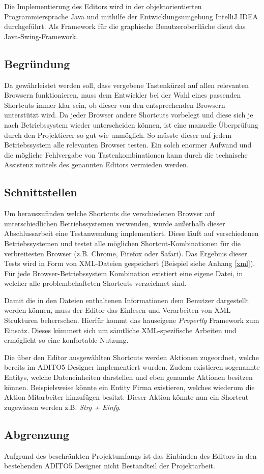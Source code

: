 Die Implementierung des Editors wird in der objektorientierten Programmiersprache Java und mithilfe der Entwicklungsumgebung IntelliJ IDEA durchgeführt. Als Framework für die graphische Benutzeroberfläche dient das Java-Swing-Framework.

\subsection{Begründung}

Da gewährleistet werden soll, dass vergebene Tastenkürzel auf allen relevanten Browsern funktionieren, muss dem Entwickler bei der Wahl eines passenden Shortcuts immer klar sein, ob dieser von den entsprechenden Browsern unterstützt wird. Da jeder Browser andere Shortcuts vorbelegt und diese sich je nach Betriebssystem wieder unterscheiden können, ist eine manuelle Überprüfung durch den Projektierer so gut wie unmöglich. So müsste dieser auf jedem Betriebssystem alle relevanten Browser testen. Ein solch enormer Aufwand und die mögliche Fehlvergabe von Tastenkombinationen kann durch die technische Assistenz mittels des genannten Editors vermieden werden.

\subsection{Schnittstellen}
\label{schnittstellen} 

Um herauszufinden welche Shortcuts die verschiedenen Browser auf unterschiedlichen Betriebssystemen verwenden, wurde außerhalb dieser Abschlussarbeit eine Testanwendung implementiert. Diese läuft auf verschiedenen Betriebssystemen und testet alle möglichen Shortcut-Kombinationen für die verbreitesten Browser (z.B. Chrome, Firefox oder Safari). Das Ergebnis dieser Tests wird in Form von XML-Dateien gespeichert (Beispiel siehe Anhang \ref{xml}). Für jede Browser-Betriebssystem Kombination existiert eine eigene Datei, in welcher alle problembehafteten Shortcuts verzeichnet sind.

Damit die in den Dateien enthaltenen Informationen dem Benutzer dargestellt werden können, muss der Editor das Einlesen und Verarbeiten von XML-Strukturen beherrschen. Hierfür kommt das hauseigene \emph{Propertly} Framework zum Einsatz. Dieses kümmert sich um sämtliche XML-spezifische Arbeiten und ermöglicht so eine konfortable Nutzung.

Die über den Editor ausgewählten Shortcuts werden Aktionen zugeordnet, welche bereits im ADITO5 Designer implementiert wurden. Zudem existieren sogenannte Entitys, welche Dateneinheiten darstellen und eben genannte Aktionen besitzen können. Beispielsweise könnte ein Entity \glqq Firma\grqq\xspace existieren, welches wiederum die Aktion \glqq Mitarbeiter hinzufügen\grqq\xspace besitzt. Dieser Aktion könnte nun ein Shortcut zugewiesen werden z.B. \emph{Strg + Einfg}.


\subsection{Abgrenzung}

Aufgrund des beschränkten Projektumfangs ist das Einbinden des Editors in den bestehenden ADITO5 Designer nicht Bestandteil der Projektarbeit.






\newpage